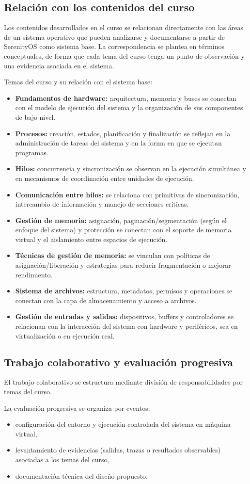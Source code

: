 \subsection{Relación con los contenidos del curso}
Los contenidos desarrollados en el curso se relacionan directamente con las áreas de un sistema operativo que pueden analizarse y documentarse a partir de SerenityOS como sistema base. La correspondencia se plantea en términos conceptuales, de forma que cada tema del curso tenga un punto de observación y una evidencia asociada en el sistema.

Temas del curso y su relación con el sistema base:
\begin{itemize}
	\item \textbf{Fundamentos de hardware:} arquitectura, memoria y buses se conectan con el modelo de ejecución del sistema y la organización de sus componentes de bajo nivel.
	\item \textbf{Procesos:} creación, estados, planificación y finalización se reflejan en la administración de tareas del sistema y en la forma en que se ejecutan programas.
	\item \textbf{Hilos:} concurrencia y sincronización se observan en la ejecución simultánea y en mecanismos de coordinación entre unidades de ejecución.
	\item \textbf{Comunicación entre hilos:} se relaciona con primitivas de sincronización, intercambio de información y manejo de secciones críticas.
	\item \textbf{Gestión de memoria:} asignación, paginación/segmentación (según el enfoque del sistema) y protección se conectan con el soporte de memoria virtual y el aislamiento entre espacios de ejecución.
	\item \textbf{Técnicas de gestión de memoria:} se vinculan con políticas de asignación/liberación y estrategias para reducir fragmentación o mejorar rendimiento.
	\item \textbf{Sistema de archivos:} estructura, metadatos, permisos y operaciones se conectan con la capa de almacenamiento y acceso a archivos.
	\item \textbf{Gestión de entradas y salidas:} dispositivos, buffers y controladores se relacionan con la interacción del sistema con hardware y periféricos, sea en virtualización o en ejecución real.
\end{itemize}

\subsection{Trabajo colaborativo y evaluación progresiva}
El trabajo colaborativo se estructura mediante división de responsabilidades por temas del curso.

La evaluación progresiva se organiza por eventos:
\begin{itemize}
	\item configuración del entorno y ejecución controlada del sistema en máquina virtual,
	\item levantamiento de evidencias (salidas, trazas o resultados observables) asociadas a los temas del curso,
	\item documentación técnica del diseño propuesto.
\end{itemize}